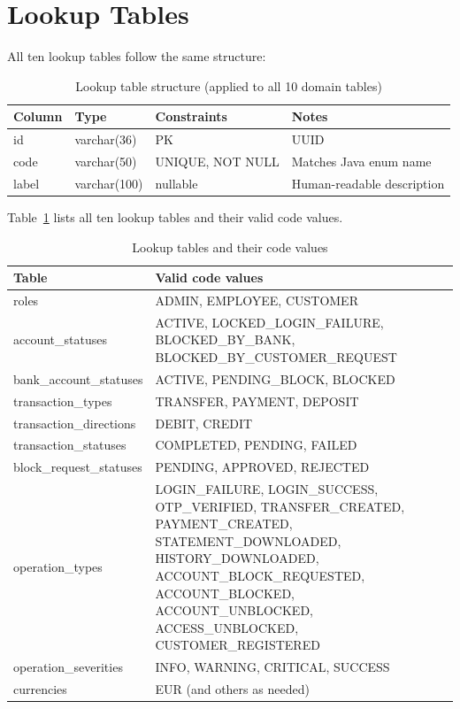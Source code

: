 \documentclass[12pt,a4paper]{report}
\begin{document}
\section{Lookup Tables}

All ten lookup tables follow the same structure:

\begin{table}[H]
  \centering
  \caption{Lookup table structure (applied to all 10 domain tables)}
  \begin{tabular}{llll}
    \toprule
    \textbf{Column} & \textbf{Type} & \textbf{Constraints} & \textbf{Notes} \\
    \midrule
    id    & varchar(36)  & PK              & UUID \\
    code  & varchar(50)  & UNIQUE, NOT NULL & Matches Java enum name \\
    label & varchar(100) & nullable         & Human-readable description \\
    \bottomrule
  \end{tabular}
\end{table}

Table~\ref{tab:lookups} lists all ten lookup tables and their valid code values.

\begin{table}[H]
  \centering
  \caption{Lookup tables and their code values}
  \label{tab:lookups}
  \begin{tabular}{ll}
    \toprule
    \textbf{Table} & \textbf{Valid code values} \\
    \midrule
    roles                   & ADMIN, EMPLOYEE, CUSTOMER \\
    account\_statuses       & ACTIVE, LOCKED\_LOGIN\_FAILURE, BLOCKED\_BY\_BANK,
                              BLOCKED\_BY\_CUSTOMER\_REQUEST \\
    bank\_account\_statuses & ACTIVE, PENDING\_BLOCK, BLOCKED \\
    transaction\_types      & TRANSFER, PAYMENT, DEPOSIT \\
    transaction\_directions & DEBIT, CREDIT \\
    transaction\_statuses   & COMPLETED, PENDING, FAILED \\
    block\_request\_statuses& PENDING, APPROVED, REJECTED \\
    operation\_types        & LOGIN\_FAILURE, LOGIN\_SUCCESS, OTP\_VERIFIED,
                              TRANSFER\_CREATED, PAYMENT\_CREATED,
                              STATEMENT\_DOWNLOADED, HISTORY\_DOWNLOADED,
                              ACCOUNT\_BLOCK\_REQUESTED, ACCOUNT\_BLOCKED,
                              ACCOUNT\_UNBLOCKED, ACCESS\_UNBLOCKED,
                              CUSTOMER\_REGISTERED \\
    operation\_severities   & INFO, WARNING, CRITICAL, SUCCESS \\
    currencies              & EUR (and others as needed) \\
    \bottomrule
  \end{tabular}
\end{table}
\end{document}

